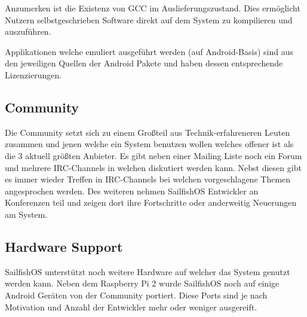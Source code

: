 Anzumerken ist die Existenz von GCC im Auslieferungszustand. Dies ermöglicht Nutzern selbstgeschrieben Software direkt auf dem System zu kompilieren\cite{online:sailfish-list-licenses} und auszuführen.

Applikationen welche emuliert ausgeführt werden (auf Android-Basis) sind aus den jeweiligen Quellen der Android Pakete und haben dessen entsprechende Lizenzierungen.\\

\subsection{Community}
Die Community setzt sich zu einem Großteil aus Technik-erfahreneren Leuten zusammen und jenen welche ein System benutzen wollen welches offener ist als die 3 aktuell größten Anbieter. Es gibt neben einer Mailing Liste noch ein Forum und mehrere IRC-Channels\cite{online:sailfish-communitygeneral} in welchen diskutiert werden kann. Nebst diesen gibt es immer wieder Treffen in IRC-Channels bei welchen vorgeschlagene Themen angesprochen werden. Des weiteren nehmen SailfishOS Entwickler an Konferenzen teil und zeigen dort ihre Fortschritte oder anderweitig Neuerungen am System.\\
\iffalse
\subsubsection{Developer Support}
\cite{online:jolla-store-terms}
https://harbour.jolla.com/\\
https://github.com/sailfishos\\
https://talk.maemo.org/showthread.php?t=92852\\
http://talk.maemo.org/showthread.php?p=1482661\#post1482661\\
https://github.com/maliit\\
https://talk.maemo.org/showthread.php?t=92036\\
\fi

\subsection{Hardware Support}
\mbox{SailfishOS} unterstützt noch weitere Hardware auf welcher das System genutzt werden kann. Neben dem Raspberry Pi 2\cite{online:sailfish-rpi2} wurde \mbox{SailfishOS} noch auf einige Android Geräten von der Community\cite{online:sailfish-android-port} portiert. Diese Ports sind je nach Motivation und Anzahl der Entwickler mehr oder weniger ausgereift\cite{online:sailfish-porters}.

